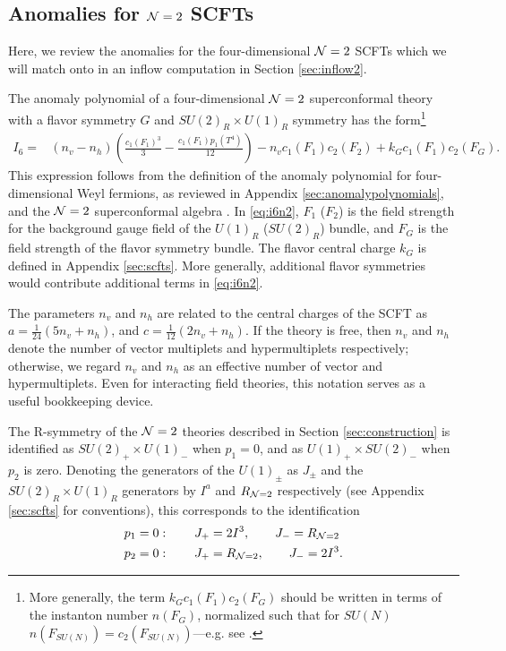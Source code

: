 \documentclass[a4paper,11pt]{article}
\newcommand{\ba}[1]{\begin{align} #1 \end{align} }
\newcommand{\bs}[1]{\begin{split} #1 \end{split} }
\def\CN{{\cal N}}
\begin{document}
\subsection*{Anomalies for $\CN=2$ SCFTs}%

Here, we review the anomalies for the four-dimensional $\CN=2$ SCFTs which we will match onto in an inflow computation in Section \ref{sec:inflow2}.

The anomaly polynomial of a four-dimensional $\CN=2$ superconformal theory with a flavor symmetry $G$ and $SU(2)_R\times U(1)_R$ symmetry has the form\footnote{More generally, the term $k_G c_1(F_{1}) c_2(F_G)$ should be written in terms of the instanton number $n(F_G)$, normalized such that for $SU(N)$ $n(F_{SU(N)})=c_2(F_{SU(N)})$---e.g. see \cite{Tachikawa:2015bga}.}
	\ba{
	I_6=& (n_v-n_h) \left( \frac{c_1 (F_{1})^3}{3} - \frac{c_1(F_{1})p_1(T^4)}{12} \right) - n_v c_1(F_{1}) c_2(F_{2}) + k_G c_1(F_{1}) c_2(F_G). \label{eq:i6n2}
	}
This expression follows from the definition of the anomaly polynomial for four-dimensional Weyl fermions, as reviewed in Appendix \ref{sec:anomalypolynomials}, and the $\CN=2$ superconformal algebra \cite{Kuzenko:1999pi}. 
In \eqref{eq:i6n2}, $F_{1}$ ($F_{2}$) is the field strength for the background gauge field of the $U(1)_R$ ($SU(2)_R$) bundle, and $F_G$ is the field strength of the flavor symmetry bundle. The flavor central charge $k_G$ is defined in Appendix \ref{sec:scfts}. More generally, additional flavor symmetries would contribute additional terms in \eqref{eq:i6n2}. 

The parameters $n_v$ and $n_h$ are related to the central charges of the SCFT as $a=\frac{1}{24}(5n_v+n_h)$, and $c=\frac{1}{12}(2n_v+n_h)$. If the theory is free, then $n_v$ and $n_h$ denote the number of vector multiplets and hypermultiplets respectively; otherwise, we regard $n_v$ and $n_h$ as an effective number of vector and hypermultiplets. Even for interacting field theories, this notation serves as a useful bookkeeping device.

The R-symmetry of the $\CN=2$ theories described in Section \ref{sec:construction} is identified as $SU(2)_+\times U(1)_-$ when $p_1=0$, and as $U(1)_+\times SU(2)_-$ when $p_2$ is zero. Denoting the generators of the $U(1)_\pm$ as $J_\pm$ and the $SU(2)_R\times U(1)_R$ generators by $I^a$ and $R_{\CN=2}$ respectively (see Appendix \ref{sec:scfts} for conventions), this corresponds to the identification
	\ba{\bs{
	p_1&=0:\qquad J_+=2I^3,\qquad J_-=R_{\CN=2}\\
	p_2&=0:\qquad J_+=R_{\CN=2},\qquad J_-=2I^3.
	}\label{eq:gens}}
\end{document}
